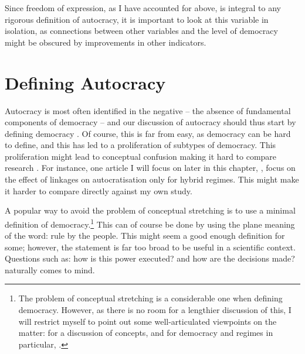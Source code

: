 Since freedom of expression, as I have accounted for above, is integral to any rigorous definition of autocracy, it is important to look at this variable in isolation, as connections between other variables and the level of democracy might be obscured by improvements in other indicators.

\section{Defining Autocracy}
Autocracy is most often identified in the negative -- the absence of fundamental components of democracy -- and our discussion of autocracy should thus start by defining democracy \citep{dahl_polyarchy_1971, przeworski_democracy_1991, schumpeter_capitalism_2010}. Of course, this is far from easy, as democracy can be hard to define, and this has led to a proliferation of subtypes of democracy. This proliferation might lead to conceptual confusion making it hard to compare research \citep{collier_democracy_1997}. For instance, one article I will focus on later in this chapter, \citet{tansey_ties_2017}, focus on the effect of linkages on autocratisation only for hybrid regimes. This might make it harder to compare directly against my own study. 

A popular way to avoid the problem of conceptual stretching is to use a minimal definition of democracy.\footnote{The problem of conceptual stretching is a considerable one when defining democracy. However, as there is no room for a lengthier discussion of this, I will restrict myself to point out some well-articulated viewpoints on the matter: \citealp[see:][]{collier_conceptual_1993, sartori_concept_1970} for a discussion of concepts, and for democracy and regimes in particular, \citealp[see:][]{alvarez_classifying_1996, collier_democracy_1997}.} This can of course be done by using the plane meaning of the word: rule by the people. This might seem a good enough definition for some; however, the statement is far too broad to be useful in a scientific context. Questions such as: how is this power executed? and how are the decisions made? naturally comes to mind.

